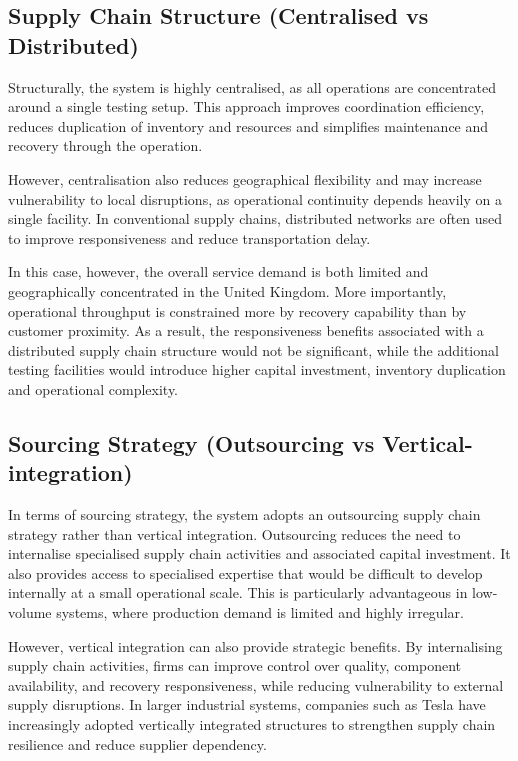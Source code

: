 \documentclass[11pt, a4paper]{report}
\numberwithin{equation}{section}
\begin{document}
\begin{refsection}
\subsection{Supply Chain Structure (Centralised vs Distributed)}%

Structurally, the system is highly centralised, as all operations are concentrated around a single testing setup. This approach improves coordination efficiency, reduces duplication of inventory and resources and simplifies maintenance and recovery through the operation. 

However, centralisation also reduces geographical flexibility and may increase vulnerability to local disruptions, as operational continuity depends heavily on a single facility\cite{centralisation}. In conventional supply chains, distributed networks are often used to improve responsiveness and reduce transportation delay. 

In this case, however, the overall service demand is both limited and geographically concentrated in the United Kingdom. More importantly, operational throughput is constrained more by recovery capability than by customer proximity. As a result, the responsiveness benefits associated with a distributed supply chain structure would not be significant, while the additional testing facilities would introduce higher capital investment, inventory duplication and operational complexity.

\subsection{Sourcing Strategy (Outsourcing vs Vertical-integration)}%

In terms of sourcing strategy, the system adopts an outsourcing supply chain strategy rather than vertical integration. Outsourcing reduces the need to internalise specialised supply chain activities and associated capital investment. It also provides access to specialised expertise that would be difficult to develop internally at a small operational scale. This is particularly advantageous in low-volume systems, where production demand is limited and highly irregular.

However, vertical integration can also provide strategic benefits. By internalising supply chain activities, firms can improve control over quality, component availability, and recovery responsiveness, while reducing vulnerability to external supply disruptions. In larger industrial systems, companies such as Tesla have increasingly adopted vertically integrated structures to strengthen supply chain resilience and reduce supplier dependency.\cite{tesla}


\end{refsection}
\end{document}
